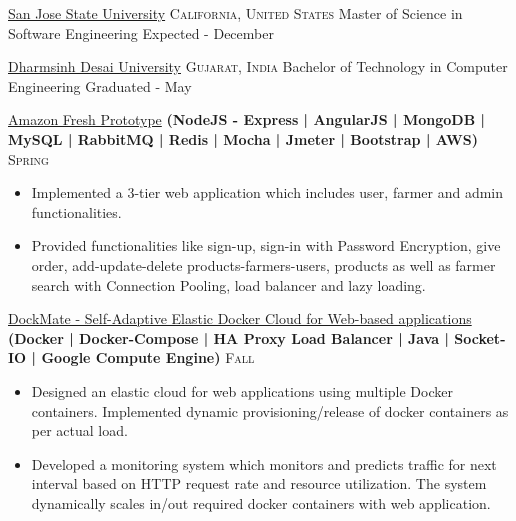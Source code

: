 \documentclass[10pt,a4paper]{article}
\begin{document}
{{\headedsection
  {\href{http://www.sjsu.edu/}{San Jose State University} {}}
  {\textsc{California, United States}} {%
  \headedsubsection
    {Master of Science in Software Engineering}
    {Expected - December }
    {}
}


\headedsection
  {\href{http://ddu.ac.in}{Dharmsinh Desai University} {}}
  {\textsc{Gujarat, India}} {%
  \headedsubsection
    {Bachelor of Technology in Computer Engineering}
    {Graduated - May }
    {}
}

\spacedhrule{0.0em}{-0.4em}




\headedsection  %
  {\href{https://github.com/darshilsaraiya/Amazon}{Amazon Fresh Prototype}
  \textbf{
  \small{(NodeJS - Express | AngularJS | MongoDB | MySQL | RabbitMQ | Redis | Mocha | Jmeter | Bootstrap | AWS)}}}
  {\textsc{Spring }} {%
  
    {\bodytext
    {
    \begin{itemize}
        \item Implemented a 3-tier web application which includes user, farmer and admin functionalities.
        \item Provided functionalities like sign-up, sign-in with Password Encryption, give order, add-update-delete products-farmers-users, products as well as farmer search with Connection Pooling, load balancer and lazy loading.
    \end{itemize}}}
}

\headedsection  %
  {\href{https://github.com/darshilsaraiya/dockmate}{DockMate - Self-Adaptive Elastic Docker Cloud for Web-based applications}
  \textbf{
  \small{(Docker | Docker-Compose | HA Proxy Load Balancer | Java | Socket-IO | Google Compute Engine)}}}
  {\textsc{Fall }} {%
  
    {\bodytext
    {
    \begin{itemize}
        \item Designed an elastic cloud for web applications using multiple Docker containers. Implemented dynamic provisioning/release of docker containers as per actual load.
        \item Developed a monitoring system which monitors and predicts traffic for next interval based on HTTP request rate and resource utilization. The system dynamically scales in/out required docker containers with web application.
    \end{itemize}}}
}


}}
\end{document}
